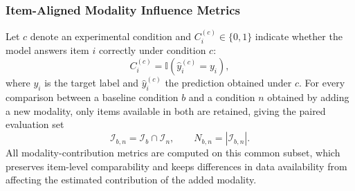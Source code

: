 \subsubsection*{Item-Aligned Modality Influence Metrics}
Let \(c\) denote an experimental condition and \(C_i^{(c)} \in \{0,1\}\) indicate whether the model answers item \(i\) correctly under condition \(c\):
\begin{equation}
C_i^{(c)}
=
\mathbb{I}
\left(
\hat{y}_i^{(c)} = y_i
\right),
\end{equation}
where \(y_i\) is the target label and \(\hat{y}_i^{(c)}\) the prediction obtained under \(c\).
For every comparison between a baseline condition \(b\) and a condition \(n\) obtained by adding a new modality, only items available in both are retained, giving the paired evaluation set
\begin{equation}
\mathcal{I}_{b,n}
=
\mathcal{I}_{b}
\cap
\mathcal{I}_{n},
\qquad
N_{b,n}
=
\left|
\mathcal{I}_{b,n}
\right|.
\end{equation}
All modality-contribution metrics are computed on this common subset, which preserves item-level comparability and keeps differences in data availability from affecting the estimated contribution of the added modality.
